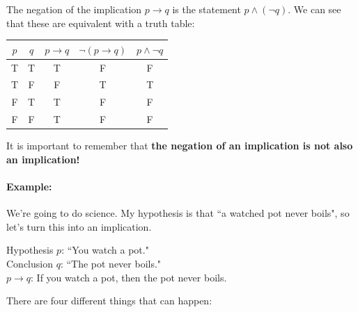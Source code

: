 \documentclass[a4paper,12pt]{book}
\begin{document}
    \begin{introNOHEAD}
        The negation of the implication $p \to q$ is the statement
        $p \land (\neg q)$. We can see that these are equivalent
        with a truth table:

        \begin{center}
            \begin{tabular}{c c | c | c | c }
                $p$ & $q$ & $p \to q$ & $\neg( p \to q)$ & $p \land \neg q$
                \\ \hline
                T & T & T & F & F
                \\
                T & F & F & T & T
                \\
                F & T & T & F & F
                \\
                F & F & T & F & F
            \end{tabular}
        \end{center}

        It is important to remember that \textbf{the negation of an
        implication is not also an implication!}

        \paragraph{Example:} We're going to do science. My hypothesis is
        that ``a watched pot never boils", so let's turn this into an
        implication.

        \begin{center}
            Hypothesis $p$: ``You watch a pot." \\
            Conclusion $q$: ``The pot never boils." \\
            $p \to q$: If you watch a pot, then the pot never boils.
        \end{center}

        There are four different things that can happen:


\end{introNOHEAD}
\end{document}
